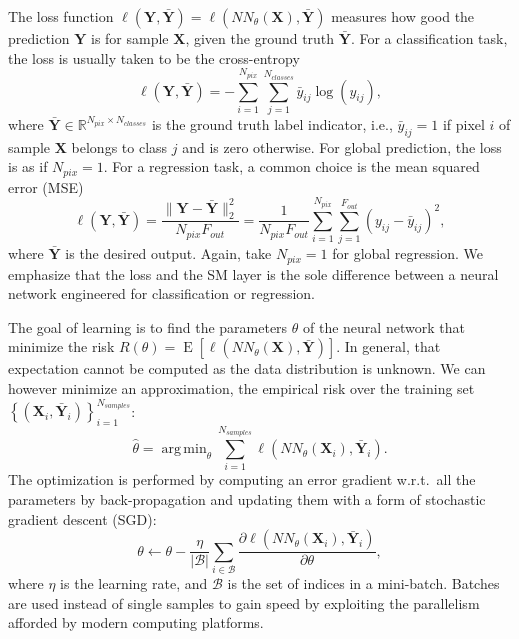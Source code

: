 \documentclass[final,twocolumn,3p,times,authoryear]{elsarticle}
\renewcommand{\b}[1]{{\bm{#1}}}   %
\newcommand{\1}{\b{1}}              %
\newcommand{\0}{\b{0}}              %
\newcommand{\B}{\mathcal{B}}
\newcommand{\X}{\b{X}}
\newcommand{\Y}{\b{Y}}
\newcommand{\R}{\mathbb{R}}
\DeclareMathOperator*{\esp}{E}
\DeclareMathOperator*{\argmin}{arg \, min}
\begin{document}
The loss function $\ell(\Y, \bar \Y) = \ell(NN_\theta(\X), \bar \Y)$ measures how good the prediction $\Y$ is for sample $\X$, given the ground truth $\bar \Y$. For a classification task, the loss is usually taken to be the cross-entropy
\begin{equation*}
	\ell(\Y, \bar \Y) = - \sum_{i=1}^{N_{pix}} \sum_{j=1}^{N_{classes}} \bar y_{ij} \log(y_{ij}),
\end{equation*}
where $\bar \Y \in \R^{N_{pix} \times N_{classes}}$ is the ground truth label indicator, i.e., $\bar y_{ij} = 1$ if pixel $i$ of sample $\X$ belongs to class $j$ and is zero otherwise. For global prediction, the loss is as if $N_{pix} = 1$.
For a regression task, a common choice is the mean squared error (MSE)
\begin{equation*}
	\ell(\Y, \bar \Y) = \frac{\|\Y-\bar{\Y}\|_2^2}{N_{pix} F_{out}} = \frac{1}{N_{pix} F_{out}} \sum_{i=1}^{N_{pix}} \sum_{j=1}^{F_{out}} (y_{ij} - \bar y_{ij})^2,
\end{equation*}
where $\bar{\Y}$ is the desired output. Again, take $N_{pix} = 1$ for global regression. We emphasize that the loss and the SM layer is the sole difference between a neural network engineered for classification or regression.

The goal of learning is to find the parameters $\theta$ of the neural network that minimize the risk $R(\theta) = \esp \left[ \ell \left( NN_\theta(\X), \bar \Y \right) \right]$. In general, that expectation cannot be computed as the data distribution is unknown. We can however minimize an approximation, the empirical risk over the training set $\left\{ \left( \X_i, \bar \Y_i \right) \right\}_{i=1}^{N_{samples}}$:
\begin{equation*}
	\hat{\theta} = \argmin_\theta \sum_{i=1}^{N_{samples}} \ell \left(NN_\theta(\X_i), \bar \Y_i \right).
\end{equation*}
The optimization is performed by computing an error gradient w.r.t.\ all the parameters by back-propagation and updating them with a form of stochastic gradient descent (SGD):
\begin{equation*}
	\theta \leftarrow \theta - \frac{\eta}{|\B|} \sum_{i \in \B} \frac{\partial \ell \left( NN_\theta(\X_i), \bar \Y_i \right)}{\partial \theta} ,
\end{equation*}
where $\eta$ is the learning rate, and $\B$ is the set of indices in a mini-batch. Batches are used instead of single samples to gain speed by exploiting the parallelism afforded by modern computing platforms.
\end{document}
